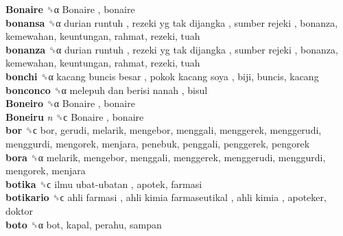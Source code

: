\textbf{Bonaire} ␝α   Bonaire , bonaire  \\
\textbf{bonansa} ␝α   durian runtuh ,  rezeki yg tak dijangka ,  sumber rejeki , bonanza, kemewahan, keuntungan, rahmat, rezeki, tuah  \\
\textbf{bonanza} ␝α   durian runtuh ,  rezeki yg tak dijangka ,  sumber rejeki , bonanza, kemewahan, keuntungan, rahmat, rezeki, tuah  \\
\textbf{bonchi} ␝α   kacang buncis besar ,  pokok kacang soya , biji, buncis, kacang  \\
\textbf{bonconco} ␝α   melepuh dan berisi nanah , bisul  \\
\textbf{Boneiro} ␝α   Bonaire , bonaire  \\
\textbf{Boneiru} \emph{n}  ␝ϲ   Bonaire , bonaire  \\
\textbf{bor} ␝ϲ  bor, gerudi, melarik, mengebor, menggali, menggerek, menggerudi, menggurdi, mengorek, menjara, penebuk, penggali, penggerek, pengorek  \\
\textbf{bora} ␝α  melarik, mengebor, menggali, menggerek, menggerudi, menggurdi, mengorek, menjara  \\
\textbf{botika} ␝ϲ   ilmu ubat-ubatan , apotek, farmasi  \\
\textbf{botikario} ␝ϲ   ahli farmasi ,  ahli kimia farmaseutikal ,  ahli kimia , apoteker, doktor  \\
\textbf{boto} ␝α  bot, kapal, perahu, sampan  \\
